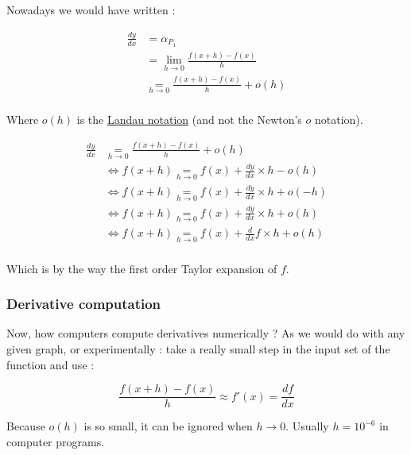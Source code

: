 \documentclass[12pt]{article}
\newcommand\underrel[2]{\mathrel{\mathop{#2}\limits_{#1}}}
\begin{document}
Nowadays we would have written :

\begin{equation*}
    \begin{split}
        \frac{dy}{dx} &= \alpha_{P_1} \\
                    &= \lim_{ h \to 0} \frac{f(x + h) - f(x)}{h} \\
                    & \underrel{h \to 0}{=} \frac{f(x + h) - f(x)}{h} + o(h)  \\
    \end{split}
\end{equation*}

Where $o(h)$ is the \href{https://simple.wikipedia.org/wiki/Big_O_notation}{Landau notation} (and not the Newton's $o$ notation).


\begin{equation*}
    \begin{split}
        \frac{dy}{dx} & \underrel{h \to 0}{=} \frac{f(x + h) - f(x)}{h} + o(h)  \\
                    &\Leftrightarrow f(x + h) \underrel{h \to 0}{=}  f(x) + \frac{dy}{dx} \times h - o(h) \\
                    &\Leftrightarrow  f(x + h) \underrel{h \to 0}{=} f(x) + \frac{dy}{dx} \times h + o(-h) \\
                    &\Leftrightarrow  f(x + h) \underrel{h \to 0}{=} f(x) + \frac{dy}{dx} \times h + o(h) \\
                    &\Leftrightarrow  f(x + h) \underrel{h \to 0}{=} f(x) + \frac{d}{dx}f \times h + o(h) \\
    \end{split}
\end{equation*}

Which is by the way the first order Taylor expansion of $f$.


\subsubsection{Derivative computation}


Now, how computers compute derivatives numerically ? As we would do with any given graph, or experimentally : take a really small step in the input set of the function and use :

$$
\frac{f(x+h) - f(x)}{h} \approx f'(x) = \frac{df}{dx}
$$

Because $o(h)$ is so small, it can be ignored when $h \rightarrow 0$. Usually $h=10^{-6}$ in computer programs.
\end{document}

